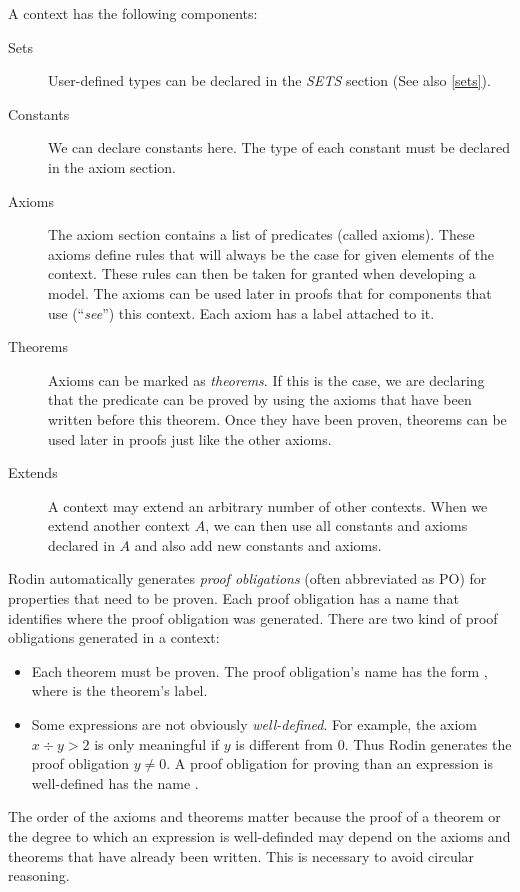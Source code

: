 A context has the following components:
\begin{description}
\item[Sets]
  User-defined types can be declared in the \textsl{SETS} section
  (See also \ref{sets}).
\item[Constants]
  We can declare constants here. The type of each constant must be declared in the axiom section.
\item[Axioms] The axiom section contains a list of predicates (called axioms).
  These axioms define rules that will always be the case for given elements of the context. These rules can then be taken for granted when developing a model.
  The axioms can be used later in proofs that for components that
  use (``\emph{see}'') this context.
  Each axiom has a label attached to it.
\item[Theorems]
  Axioms can be marked as \emph{theorems}. If this is the case, we are declaring that
  the predicate can be proved by using the axioms that have been written 
  before this theorem.
  Once they have been proven, theorems can be used later in proofs just like the other axioms.
\item[Extends]
  A context may extend an arbitrary number of other contexts.
  When we extend another context $A$, we can then use all constants and axioms declared in $A$ and also add new constants
  and axioms.
\end{description}
Rodin automatically generates \emph{proof obligations} (often abbreviated as PO) for properties that need to be proven. Each proof obligation has a name that identifies where the proof obligation was generated.
There are two kind of proof obligations generated in a context:
\begin{itemize}
  \item Each theorem must be proven. The proof obligation's name has the form 
    , where  is the theorem's label.
  \item Some expressions are not obviously \emph{well-defined}. For example, the axiom $x \div y > 2$ is only meaningful if $y$ is different from 0.
    Thus Rodin generates the proof obligation $y\neq 0$.
    A proof obligation for proving than an expression is well-defined has the name .
\end{itemize}
The order of the axioms and theorems matter because the proof of a theorem or the degree to which an expression is well-definded may depend on the axioms and theorems that have already been written. This is necessary to avoid circular reasoning.


